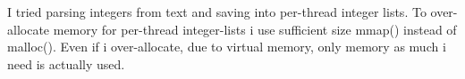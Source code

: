 I tried parsing integers from text and saving into per-thread integer lists. To over-allocate memory for per-thread integer-lists i use sufficient size mmap() instead of malloc(). Even if i over-allocate, due to virtual memory, only memory as much i need is actually used.










